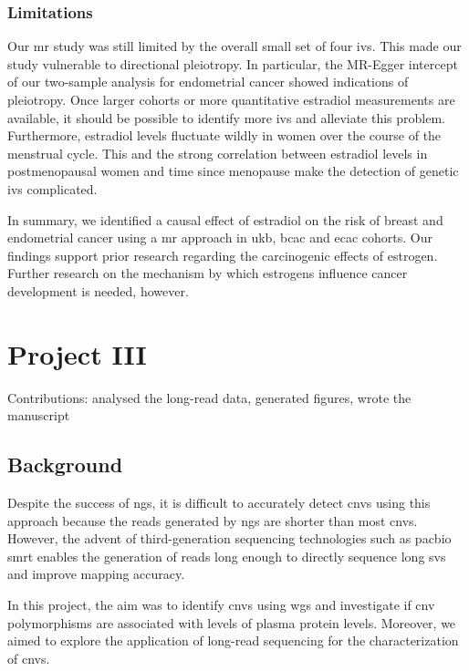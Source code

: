 \documentclass[twoside=false]{scrbook}
\begin{document}
\subsection{Limitations}
Our \gls{mr} study was still limited by the overall small set of four \glspl{iv}.
This made our study vulnerable to directional pleiotropy.
In particular, the MR-Egger intercept of our two-sample analysis for endometrial cancer showed indications of pleiotropy.
Once larger cohorts or more quantitative estradiol measurements are available, it should be possible to identify more \glspl{iv} and alleviate this problem.
Furthermore, estradiol levels fluctuate wildly in women over the course of the menstrual cycle.
This and the strong correlation between estradiol levels in postmenopausal women and time since menopause make the detection of genetic \glspl{iv} complicated.

In summary, we identified a causal effect of estradiol on the risk of breast and endometrial cancer using a \gls{mr} approach in \gls{ukb}, \gls{bcac} and \gls{ecac} cohorts.
Our findings support prior research regarding the carcinogenic effects of estrogen.
Further research on the mechanism by which estrogens influence cancer development is needed, however.

\chapter{Project III}
{
    \parindent 0pt \color{gray}
    Contributions: analysed the long-read data, generated figures, wrote the manuscript
}

\section{Background}
Despite the success of \gls{ngs}, it is difficult to accurately detect \glspl{cnv} using this approach because the reads generated by \gls{ngs} are shorter than most \glspl{cnv}.
However, the advent of third-generation sequencing technologies such as \gls{pacbio} \gls{smrt} enables the generation of reads long enough to directly sequence long \glspl{sv} and improve mapping accuracy.

In this project, the aim was to identify \glspl{cnv} using \gls{wgs} and investigate if \gls{cnv} polymorphisms are associated with levels of plasma protein levels.
Moreover, we aimed to explore the application of long-read sequencing for the characterization of \glspl{cnv}.
\end{document}

